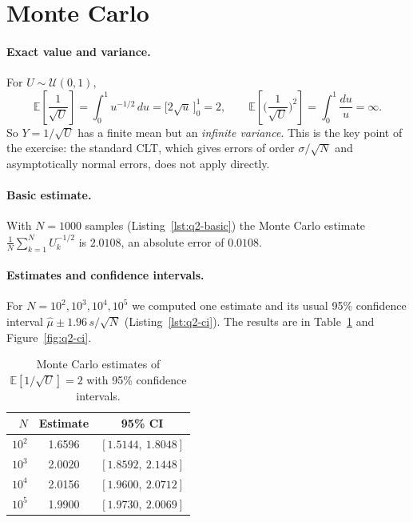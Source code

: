 \documentclass[11pt,a4paper]{article}
\begin{document}
\section{Monte Carlo}

\paragraph{Exact value and variance.} For $U \sim \mathcal U(0,1)$,
\[
  \mathbb E\!\left[\frac{1}{\sqrt U}\right] = \int_0^1 u^{-1/2}\,du = \big[2\sqrt u\,\big]_0^1 = 2,
  \qquad
  \mathbb E\!\left[\Big(\frac{1}{\sqrt U}\Big)^2\right] = \int_0^1 \frac{du}{u} = \infty .
\]
So $Y = 1/\sqrt U$ has a finite mean but an \emph{infinite variance}. This is the key point of
the exercise: the standard CLT, which gives errors of order $\sigma/\sqrt N$ and asymptotically
normal errors, does not apply directly.

\paragraph{Basic estimate.} With $N = 1000$ samples (Listing~\ref{lst:q2-basic}) the Monte Carlo
estimate $\frac1N\sum_{k=1}^N U_k^{-1/2}$ is $2.0108$, an absolute error of $0.0108$.

\paragraph{Estimates and confidence intervals.} For $N = 10^2, 10^3, 10^4, 10^5$ we computed one
estimate and its usual 95\% confidence interval $\hat\mu \pm 1.96\,s/\sqrt N$
(Listing~\ref{lst:q2-ci}). The results are in Table~\ref{tab:q2-ci} and
Figure~\ref{fig:q2-ci}.

\begin{table}[H]
  \centering
  \begin{tabular}{rcc}
    \toprule
    $N$ & Estimate & 95\% CI \\
    \midrule
    $10^2$ & 1.6596 & $[1.5144,\ 1.8048]$ \\
    $10^3$ & 2.0020 & $[1.8592,\ 2.1448]$ \\
    $10^4$ & 2.0156 & $[1.9600,\ 2.0712]$ \\
    $10^5$ & 1.9900 & $[1.9730,\ 2.0069]$ \\
    \bottomrule
  \end{tabular}
  \caption{Monte Carlo estimates of $\mathbb E[1/\sqrt U] = 2$ with 95\% confidence intervals.}
  \label{tab:q2-ci}
\end{table}
\end{document}
